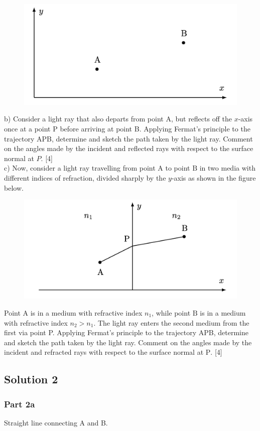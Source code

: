 \documentclass{article}
\begin{document}
\begin{figure}
	\centering
	\includegraphics[width=0.5\linewidth]{spho_book_TYS_images/2017q2.png}
	\caption{}
\end{figure}
b) Consider a light ray that also departs from point $\mathrm{A}$, but reflects off the $x$-axis once at a point P before arriving at point B. Applying Fermat's principle to the trajectory APB, determine and sketch the path taken by the light ray. Comment on the angles made by the incident and reflected rays with respect to the surface normal at $P$. [4] \\
c) Now, consider a light ray travelling from point $\mathrm{A}$ to point $\mathrm{B}$ in two media with different indices of refraction, divided sharply by the $y$-axis as shown in the figure below. \\
\begin{figure}
	\centering
	\includegraphics[width=0.5\linewidth]{spho_book_TYS_images/2017q2_2.png}
	\caption{}
\end{figure}
Point $\mathrm{A}$ is in a medium with refractive index $n_{1}$, while point $\mathrm{B}$ is in a medium with refractive index $n_{2}>n_{1}$. The light ray enters the second medium from the first via point P. Applying Fermat's principle to the trajectory APB, determine and sketch the path taken by the light ray. Comment on the angles made by the incident and refracted rays with respect to the surface normal at $\mathrm{P}$. [4]

\subsection{Solution 2}
\subsubsection{Part 2a}
Straight line connecting A and B.
\end{document}
